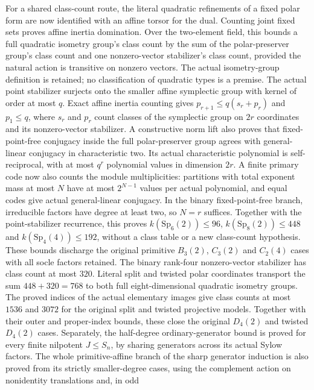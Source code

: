 For a shared class-count route, the literal quadratic refinements of a
fixed polar form are now identified with an affine torsor for the dual.
Counting joint fixed sets proves affine inertia domination. Over the
two-element field, this bounds a full quadratic isometry group's class
count by the sum of the polar-preserver group's class count and one
nonzero-vector stabilizer's class count, provided the natural action is
transitive on nonzero vectors. The actual isometry-group definition is
retained; no classification of quadratic types is a premise.
The actual point stabilizer surjects onto the smaller affine symplectic
group with kernel of order at most $q$. Exact affine inertia counting
gives $p_{r+1}\leq q(s_r+p_r)$ and $p_1\leq q$, where $s_r$ and $p_r$
count classes of the symplectic group on $2r$ coordinates and its
nonzero-vector stabilizer.
A constructive norm lift also proves that fixed-point-free conjugacy
inside the full polar-preserver group agrees with general-linear
conjugacy in characteristic two. Its actual characteristic polynomial
is self-reciprocal, with at most $q^r$ polynomial values in dimension
$2r$. A finite primary code now also counts the module multiplicities:
partitions with total exponent mass at most $N$ have at most
$2^{N-1}$ values per actual polynomial, and equal codes give actual
general-linear conjugacy. In the binary fixed-point-free branch,
irreducible factors have degree at least two, so $N=r$ suffices.
Together with the point-stabilizer recurrence, this proves
$k(\mathrm{Sp}_6(2))\leq96$, $k(\mathrm{Sp}_8(2))\leq448$ and
$k(\mathrm{Sp}_4(4))\leq192$, without a class table or a new
class-count hypothesis. These bounds discharge the original primitive
$B_3(2)$, $C_3(2)$ and $C_2(4)$ cases with all socle factors retained.
The binary rank-four nonzero-vector stabilizer has class count at most
$320$. Literal split and twisted polar coordinates transport the sum
$448+320=768$ to both full eight-dimensional quadratic isometry
groups. The proved indices of the actual elementary images give class
counts at most $1536$ and $3072$ for the original split and twisted
projective models. Together with their outer and proper-index bounds,
these close the original $D_4(2)$ and twisted $D_4(2)$ cases.
Separately, the half-degree ordinary-generator bound is proved for every
finite nilpotent $J\leq S_n$, by sharing generators across its actual
Sylow factors. The whole primitive-affine branch of the sharp generator
induction is also proved from its strictly smaller-degree cases, using
the complement action on nonidentity translations and, in odd
